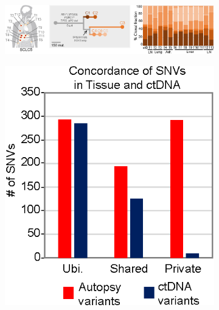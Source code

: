 \begin{figure}[htbp]
    \centering
    \begin{subfigure}{0.85\textwidth}
        \includegraphics[width=\linewidth,keepaspectratio]{images/sclc/clones_sclc5}
        \vspace{-1cm}
        \caption{}\label{fig:sclc:clones_5}
    \end{subfigure}
    
    \hspace{0.1\textwidth}%
    \begin{subfigure}{0.35\textwidth}
        \includegraphics[width=\linewidth,keepaspectratio]{images/sclc/tissue_ctdna_concordance}
        \caption{}\label{fig:sclc:tissue_ctdna_concordance}
    \end{subfigure}%
    \hfill%
    \begin{subfigure}{0.35\textwidth}

\end{subfigure}
\end{figure}

